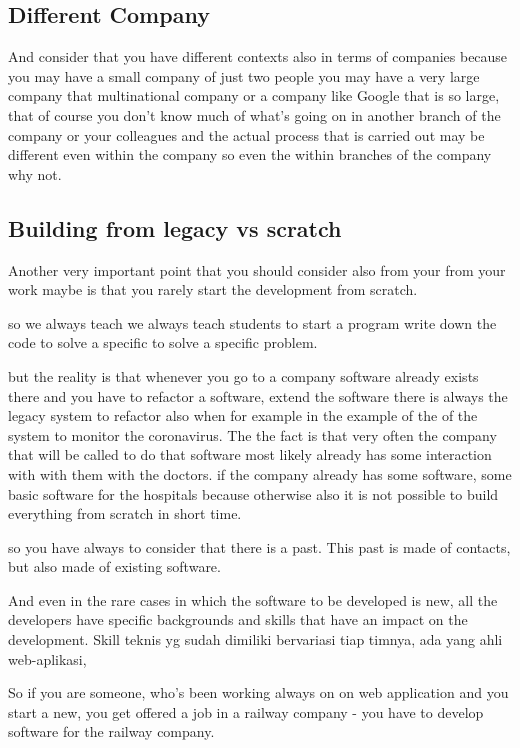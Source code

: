 \documentclass[conference, compsoc, twoside]{IEEEtran}
\begin{document}
\subsection{Different Company} %
And consider that you have different contexts also in terms of companies because you may have a small company of just two people you may have a very large company that multinational company or a company like Google that is so large,
that of course you don't know much of what's going on in another branch of the company 
or your colleagues and the actual process that is carried out may be different even within the company so even the within branches of the company why not.


\subsection{Building from legacy vs scratch} %
\label{sub:building_from_scratch}

Another very important point that you should consider also from your from your work maybe is that you rarely start the development from scratch.

so we always teach we always teach students to start a program write down the code to solve a specific to solve a specific problem. 

but the reality is that whenever you go to a company software already exists there and you have to refactor a software,
extend the software there is always the legacy system to refactor also when  for example in the example of the of the system to monitor the coronavirus. 
The the fact is that very often the company that will be called to do that software most likely already has some interaction with with them with the doctors.
if the company already has some software, some basic software for the hospitals because otherwise also 
it is not possible to build everything from scratch in short time.

so you have always to consider that there is a past. 
This past is made of contacts, but also made of existing software. 

And even in the rare cases in which the software to be developed is new, all the developers have specific backgrounds and skills that have an impact on the development.
Skill teknis yg sudah dimiliki bervariasi tiap timnya, ada yang ahli web-aplikasi, 

So if you are someone, who's been working always on on web application and you start a new, you get offered a job in a railway company - you have to develop software for the railway company. 
\end{document}
